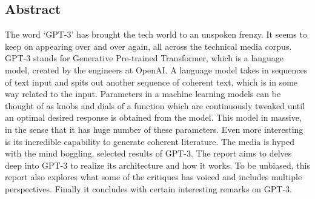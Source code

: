 \newpage
\vspace*{\fill}
\begin{center}
    \section*{\huge Abstract}
\end{center}
The word `GPT-3' has brought the tech world to an unspoken frenzy. It seems to keep on appearing over and over again, all across the technical media corpus. GPT-3 stands for Generative Pre-trained Transformer, which is a language model, created by the engineers at OpenAI. A language model takes in sequences of text input and spits out another sequence of coherent text, which is in some way related to the input. Parameters in a machine learning models can be thought of as knobs and dials of a function which are continuously tweaked until an optimal desired response is obtained from the model. This model in massive, in the sense that it has huge number of these parameters. Even more interesting is its incredible capability to generate coherent literature. The media is hyped with the mind boggling, selected results of GPT-3. The report aims to delves deep into GPT-3 to realize its architecture and how it works. To be unbiased, this report also explores what some of the critiques has voiced and includes multiple perspectives. Finally it concludes with certain interesting remarks on GPT-3.
\vspace*{\fill}